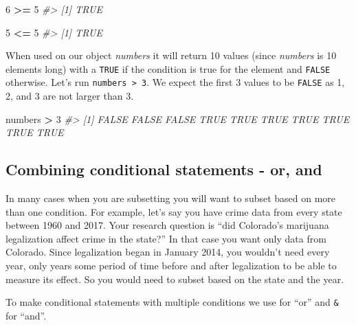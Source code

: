\documentclass[
  12pt,
]{book}
\newenvironment{Shaded}{\begin{snugshade}}{\end{snugshade}}
\newcommand{\CommentTok}[1]{\textcolor[rgb]{0.37,0.37,0.37}{\textit{#1}}}
\newcommand{\DecValTok}[1]{\textcolor[rgb]{0.06,0.06,0.06}{#1}}
\newcommand{\NormalTok}[1]{#1}
\newcommand{\OperatorTok}[1]{\textcolor[rgb]{0.43,0.43,0.43}{\textbf{#1}}}
\newcommand{\StringTok}[1]{\textcolor[rgb]{0.5,0.5,0.5}{#1}}
\begin{document}
\begin{Shaded}
\begin{Highlighting}[]
\DecValTok{6} \OperatorTok{>=}\StringTok{ }\DecValTok{5}
\CommentTok{\#> [1] TRUE}
\end{Highlighting}
\end{Shaded}

\begin{Shaded}
\begin{Highlighting}[]
\DecValTok{5} \OperatorTok{<=}\StringTok{ }\DecValTok{5}
\CommentTok{\#> [1] TRUE}
\end{Highlighting}
\end{Shaded}

When used on our object \emph{numbers} it will return 10 values (since \emph{numbers} is 10 elements long) with a \texttt{TRUE} if the condition is true for the element and \texttt{FALSE} otherwise. Let's run \texttt{numbers\ \textgreater{}\ 3}. We expect the first 3 values to be \texttt{FALSE} as 1, 2, and 3 are not larger than 3.

\begin{Shaded}
\begin{Highlighting}[]
\NormalTok{numbers }\OperatorTok{>}\StringTok{ }\DecValTok{3}
\CommentTok{\#>  [1] FALSE FALSE FALSE  TRUE  TRUE  TRUE  TRUE  TRUE  TRUE  TRUE}
\end{Highlighting}
\end{Shaded}

\hypertarget{combining-conditional-statements---or-and}{%
\subsection{Combining conditional statements - or, and}\label{combining-conditional-statements---or-and}}

In many cases when you are subsetting you will want to subset based on more than one condition. For example, let's say you have crime data from every state between 1960 and 2017. Your research question is ``did Colorado's marijuana legalization affect crime in the state?'' In that case you want only data from Colorado. Since legalization began in January 2014, you wouldn't need every year, only years some period of time before and after legalization to be able to measure its effect. So you would need to subset based on the state and the year.

To make conditional statements with multiple conditions we use \texttt{\textbar{}} for ``or'' and \texttt{\&} for ``and''.
\end{document}
